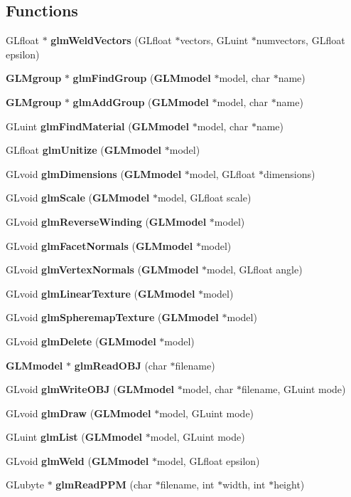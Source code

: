\subsection*{Functions}
\begin{DoxyCompactItemize}
\item 
G\-Lfloat $\ast$ {\bf glm\-Weld\-Vectors} (G\-Lfloat $\ast$vectors, G\-Luint $\ast$numvectors, G\-Lfloat epsilon)
\item 
{\bf G\-L\-Mgroup} $\ast$ {\bf glm\-Find\-Group} ({\bf G\-L\-Mmodel} $\ast$model, char $\ast$name)
\item 
{\bf G\-L\-Mgroup} $\ast$ {\bf glm\-Add\-Group} ({\bf G\-L\-Mmodel} $\ast$model, char $\ast$name)
\item 
G\-Luint {\bf glm\-Find\-Material} ({\bf G\-L\-Mmodel} $\ast$model, char $\ast$name)
\item 
G\-Lfloat {\bf glm\-Unitize} ({\bf G\-L\-Mmodel} $\ast$model)
\item 
G\-Lvoid {\bf glm\-Dimensions} ({\bf G\-L\-Mmodel} $\ast$model, G\-Lfloat $\ast$dimensions)
\item 
G\-Lvoid {\bf glm\-Scale} ({\bf G\-L\-Mmodel} $\ast$model, G\-Lfloat scale)
\item 
G\-Lvoid {\bf glm\-Reverse\-Winding} ({\bf G\-L\-Mmodel} $\ast$model)
\item 
G\-Lvoid {\bf glm\-Facet\-Normals} ({\bf G\-L\-Mmodel} $\ast$model)
\item 
G\-Lvoid {\bf glm\-Vertex\-Normals} ({\bf G\-L\-Mmodel} $\ast$model, G\-Lfloat angle)
\item 
G\-Lvoid {\bf glm\-Linear\-Texture} ({\bf G\-L\-Mmodel} $\ast$model)
\item 
G\-Lvoid {\bf glm\-Spheremap\-Texture} ({\bf G\-L\-Mmodel} $\ast$model)
\item 
G\-Lvoid {\bf glm\-Delete} ({\bf G\-L\-Mmodel} $\ast$model)
\item 
{\bf G\-L\-Mmodel} $\ast$ {\bf glm\-Read\-O\-B\-J} (char $\ast$filename)
\item 
G\-Lvoid {\bf glm\-Write\-O\-B\-J} ({\bf G\-L\-Mmodel} $\ast$model, char $\ast$filename, G\-Luint mode)
\item 
G\-Lvoid {\bf glm\-Draw} ({\bf G\-L\-Mmodel} $\ast$model, G\-Luint mode)
\item 
G\-Luint {\bf glm\-List} ({\bf G\-L\-Mmodel} $\ast$model, G\-Luint mode)
\item 
G\-Lvoid {\bf glm\-Weld} ({\bf G\-L\-Mmodel} $\ast$model, G\-Lfloat epsilon)
\item 
G\-Lubyte $\ast$ {\bf glm\-Read\-P\-P\-M} (char $\ast$filename, int $\ast$width, int $\ast$height)
\end{DoxyCompactItemize}


